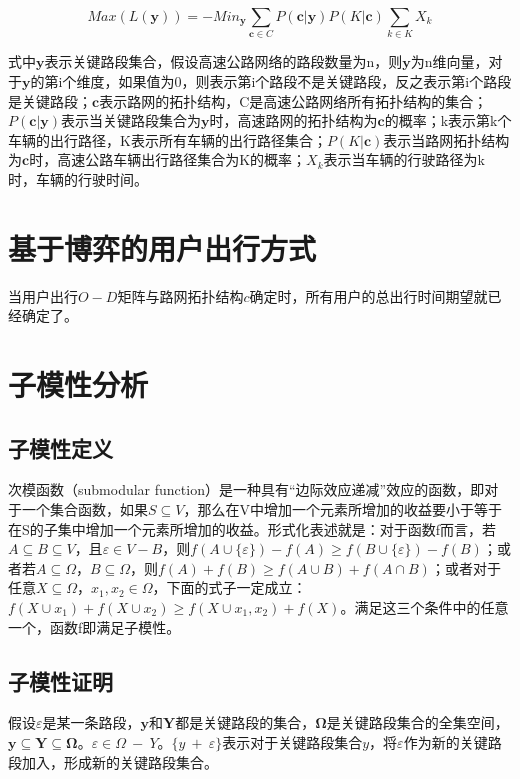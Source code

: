 		\begin{equation}
		Max(L(\bm{y})) = -Mi{n_{\bm{y} }}\sum\limits_{\bm{c} \in C} {P(\bm{c}|\bm{y} )} P(K|\bm{c})\sum\limits_{k \in K} {{X_k}} 
		\label{eq3}
		\end{equation}

		式中$\bm{y} $表示关键路段集合，假设高速公路网络的路段数量为n，则$\bm{y} $为n维向量，对于$\bm{y} $的第i个维度，如果值为0，则表示第i个路段不是关键路段，反之表示第i个路段是关键路段；$\bm{c}$表示路网的拓扑结构，C是高速公路网络所有拓扑结构的集合；${P(\bm{c}|\bm{y} )}$表示当关键路段集合为$\bm{y} $时，高速路网的拓扑结构为$\bm{c}$的概率；k表示第k个车辆的出行路径，K表示所有车辆的出行路径集合；$P(K|\bm{c})$表示当路网拓扑结构为$\bm{c}$时，高速公路车辆出行路径集合为K的概率；${{X_k}}$表示当车辆的行驶路径为k时，车辆的行驶时间。

		\section{基于博弈的用户出行方式}
			当用户出行$O-D$矩阵与路网拓扑结构$c$确定时，所有用户的总出行时间期望就已经确定了。

		\section{子模性分析}
			\subsection{子模性定义}
			次模函数（submodular function）是一种具有“边际效应递减”效应的函数，即对于一个集合函数，如果$S \subseteq V$，那么在V中增加一个元素所增加的收益要小于等于在S的子集中增加一个元素所增加的收益。形式化表述就是：对于函数f而言，若$A \subseteq B \subseteq V$，且$\varepsilon  \in V - B$，则$f(A \cup \{ \varepsilon \} ) - f(A) \ge f(B \cup \{ \varepsilon \} ) - f(B)$；或者若$A \subseteq \Omega，B \subseteq \Omega$，则$f(A) + f(B) \ge f(A\mathop  \cup \nolimits B) + f(A\mathop  \cap \nolimits B)$；或者对于任意$X \subseteq \Omega，x_1,x_2 \in \Omega$，下面的式子一定成立：$f(X \cup {x_1}) + f(X \cup {x_2}) \ge f(X \cup {x_1},{x_2}) + f(X)$。满足这三个条件中的任意一个，函数f即满足子模性。

			\subsection{子模性证明}
				假设$\varepsilon$是某一条路段，$\bm{y}$和$\bm{Y}$都是关键路段的集合，$\bm{\Omega}$是关键路段集合的全集空间，$\bm{y} \subseteq \bm{Y} \subseteq \bm{\Omega}$。$\varepsilon \in \Omega \ - \ Y$。$\{y \ + \ \varepsilon\}$表示对于关键路段集合$y$，将$\varepsilon$作为新的关键路段加入，形成新的关键路段集合。

